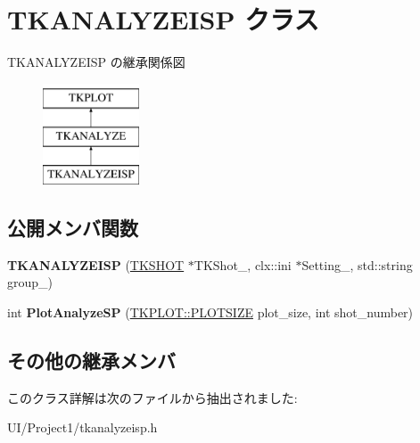 \hypertarget{class_t_k_a_n_a_l_y_z_e_i_s_p}{}\section{T\+K\+A\+N\+A\+L\+Y\+Z\+E\+I\+SP クラス}
\label{class_t_k_a_n_a_l_y_z_e_i_s_p}
T\+K\+A\+N\+A\+L\+Y\+Z\+E\+I\+SP の継承関係図\begin{figure}[H]
\begin{center}
\leavevmode
\includegraphics[height=3.000000cm]{class_t_k_a_n_a_l_y_z_e_i_s_p}
\end{center}
\end{figure}
\subsection*{公開メンバ関数}
\begin{DoxyCompactItemize}
\item 
\mbox{\label{class_t_k_a_n_a_l_y_z_e_i_s_p_ad7af6efda43ab5c62bbddd8a8b39f2ef}} 
{\bfseries T\+K\+A\+N\+A\+L\+Y\+Z\+E\+I\+SP} (\hyperlink{class_t_k_s_h_o_t}{T\+K\+S\+H\+OT} $\ast$T\+K\+Shot\+\_\+, clx\+::ini $\ast$Setting\+\_\+, std\+::string group\+\_\+)
\item 
\mbox{\label{class_t_k_a_n_a_l_y_z_e_i_s_p_a04ffee51cd9091aa6edb0ada63a0c455}} 
int {\bfseries Plot\+Analyze\+SP} (\hyperlink{class_t_k_p_l_o_t_a158082ae168750554cf23edde9a27416}{T\+K\+P\+L\+O\+T\+::\+P\+L\+O\+T\+S\+I\+ZE} plot\+\_\+size, int shot\+\_\+number)
\end{DoxyCompactItemize}
\subsection*{その他の継承メンバ}


このクラス詳解は次のファイルから抽出されました\+:\begin{DoxyCompactItemize}
\item 
U\+I/\+Project1/tkanalyzeisp.\+h\end{DoxyCompactItemize}
